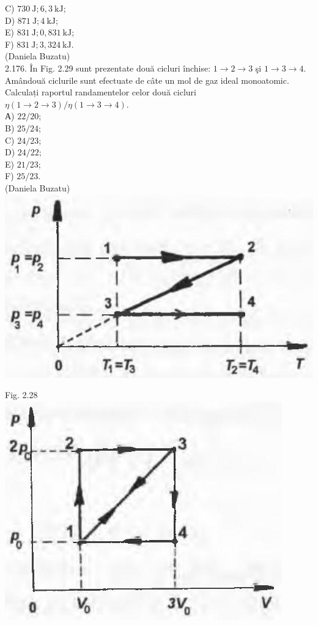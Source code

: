 \documentclass[10pt]{article}
\begin{document}
C) $730 \mathrm{~J} ; 6,3 \mathrm{~kJ}$;\\
D) $871 \mathrm{~J} ; 4 \mathrm{~kJ}$;\\
E) $831 \mathrm{~J} ; 0,831 \mathrm{~kJ}$;\\
F) $831 \mathrm{~J} ; 3,324 \mathrm{~kJ}$.\\
(Daniela Buzatu)\\
2.176. În Fig. 2.29 sunt prezentate două cicluri închise: $1 \rightarrow 2 \rightarrow 3$ şi $1 \rightarrow 3 \rightarrow 4$. Amândouă ciclurile sunt efectuate de câte un mol de gaz ideal monoatomic. Calculați raportul randamentelor celor două cicluri $\eta(1 \rightarrow 2 \rightarrow 3) / \eta(1 \rightarrow 3 \rightarrow 4)$.\\
А) $22 / 20$;\\
B) $25 / 24$;\\
C) $24 / 23$;\\
D) $24 / 22$;\\
E) $21 / 23$;\\
F) $25 / 23$.\\
(Daniela Buzatu)\\
\includegraphics[max width=\textwidth, center]{2025_07_01_5b3ff9fa0d508c8e9f17g-113(1)}

Fig. 2.28\\
\includegraphics[max width=\textwidth, center]{2025_07_01_5b3ff9fa0d508c8e9f17g-113}
\end{document}
